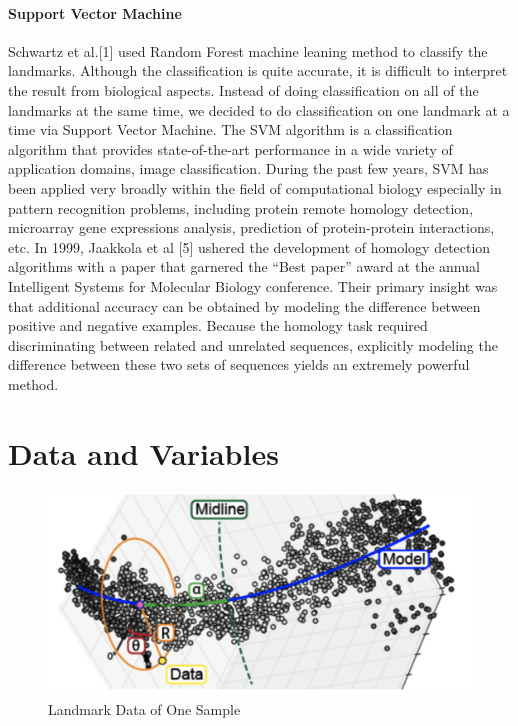 \documentclass[10pt,letterpaper]{article}
\begin{document}
\paragraph{Support Vector Machine}\label{support-vector-machine}

Schwartz et al.{[}1{]} used Random Forest machine leaning method to
classify the landmarks. Although the classification is quite accurate,
it is difficult to interpret the result from biological aspects. Instead
of doing classification on all of the landmarks at the same time, we
decided to do classification on one landmark at a time via Support
Vector Machine. The SVM algorithm is a classification algorithm that
provides state-of-the-art performance in a wide variety of application
domains, image classification. During the past few years, SVM has been
applied very broadly within the field of computational biology
especially in pattern recognition problems, including protein remote
homology detection, microarray gene expressions analysis, prediction of
protein-protein interactions, etc. In 1999, Jaakkola et al {[}5{]}
ushered the development of homology detection algorithms with a paper
that garnered the ``Best paper'' award at the annual Intelligent Systems
for Molecular Biology conference. Their primary insight was that
additional accuracy can be obtained by modeling the difference between
positive and negative examples. Because the homology task required
discriminating between related and unrelated sequences, explicitly
modeling the difference between these two sets of sequences yields an
extremely powerful method.

\section{Data and Variables}\label{data-and-variables}

\begin{figure}[h]

{\centering \includegraphics[width=5.55in]{figures/landmark} 

}

\caption{\label{landmark} Landmark Data of One Sample}\label{fig:unnamed-chunk-2}
\end{figure}
\end{document}

